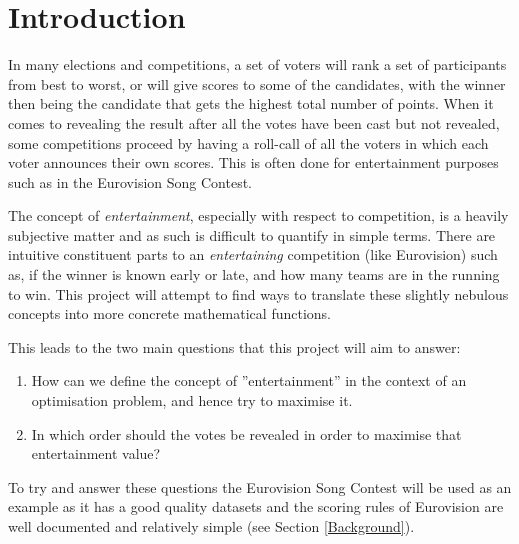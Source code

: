 \documentclass[12pt]{report}
\begin{document}
\section{Introduction}\label{Introduction}
In many elections and competitions, a set of voters will rank a set of participants from best to worst, or will give scores to some of the candidates, with the winner then being the candidate that gets the highest total number of points. When it comes to revealing the result after all the votes have been cast but not revealed, some competitions proceed by having a roll-call of all the voters in which each voter announces their own scores. This is often done for entertainment purposes such as in the Eurovision Song Contest.\cite{EurovisionVoting}

The concept of \textit{entertainment}, especially with respect to competition, is a heavily subjective matter and as such is difficult to quantify in simple terms. There are intuitive constituent parts to an \textit{entertaining} competition (like Eurovision) such as, if the winner is known early or late, and how many teams are in the running to win. This project will attempt to find ways to translate these slightly nebulous concepts into more concrete mathematical functions.  

This leads to the two main questions that this project will aim to answer:

\begin{enumerate}
\item How can we define the concept of ''entertainment'' in the context of an optimisation problem, and hence try to maximise it.
\item  In which order should the votes be revealed in order to maximise that entertainment value?
\end{enumerate}

To try and answer these questions the Eurovision Song Contest will be used as an example as it has a good quality datasets and the scoring rules of Eurovision are well documented and relatively simple (see Section \ref{Background}).
\end{document}
